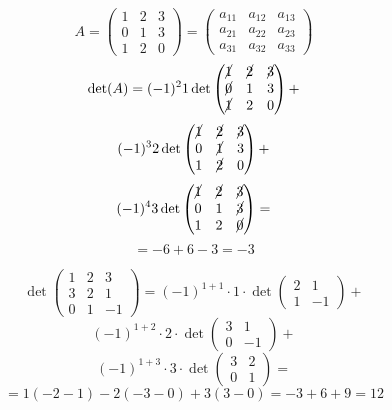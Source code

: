 \documentclass[a4paper]{article}
\theoremstyle{break}
\theoremstyle{break}
\theoremstyle{break}
\theoremstyle{break}
\begin{document}
\begin{figure}[H]
  \begin{example}
    \[
      A = \begin{pmatrix} 
        1 & 2 & 3\\
        0 & 1 & 3\\
        1 & 2 & 0
      \end{pmatrix} 
      =
      \begin{pmatrix} 
        a_{11} & a_{12} & a_{13}\\
        a_{21} & a_{22} & a_{23}\\
        a_{31} & a_{32} & a_{33}
      \end{pmatrix} 
    \] 
    \[
      \det(A) = (-1)^{2}1\det\begin{pmatrix} 
        \cancel{1} & \cancel{2} & \cancel{3} \\
        \cancel{0} & 1 & 3\\
        \cancel{1} & 2 & 0
      \end{pmatrix} +
    \] 
    \[
      (-1)^3 2 \det\begin{pmatrix} 
        \cancel{1} & \cancel{2} & \cancel{3} \\
        0 & \cancel{1} & 3\\
        1 & \cancel{2} & 0
      \end{pmatrix} +
    \] 
    \[
      (-1)^4 3 \det\begin{pmatrix} 
        \cancel{1} & \cancel{2} & \cancel{3} \\
        0 & 1 & \cancel{3}\\
        1 & 2 & \cancel{0}
      \end{pmatrix} =
    \] 
    \[
     = -6 + 6 -3 = -3
    \] 
  \end{example}
\end{figure}

\begin{figure}[H]
  \begin{example}
    \[
      \det\begin{pmatrix} 
        1 & 2 & 3\\
        3 & 2 & 1\\
        0 & 1 & -1
      \end{pmatrix}
      = (-1)^{1+1} \cdot 1 \cdot \det\begin{pmatrix} 
        2 & 1\\
        1 & -1
      \end{pmatrix} +
    \] 
    \[
      (-1)^{1+2} \cdot 2 \cdot \det\begin{pmatrix} 
        3 & 1\\
        0 & -1
      \end{pmatrix} +
    \] 
    \[
      (-1)^{1+3} \cdot 3 \cdot \det\begin{pmatrix} 
        3 & 2\\
        0 & 1
      \end{pmatrix} =
    \] 
    \[
      = 1(-2-1) - 2(-3-0) + 3(3-0) = -3 + 6 + 9 = 12
    \] 
  \end{example}
\end{figure}
\end{document}
